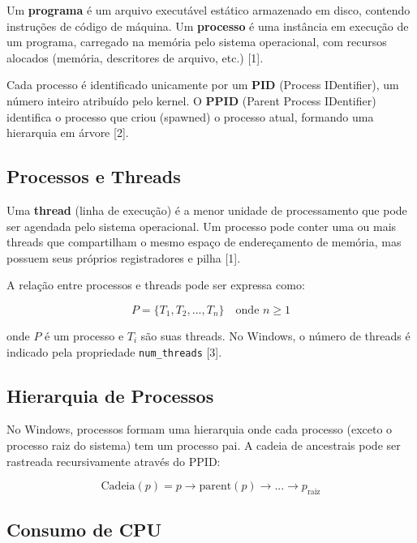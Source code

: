 \documentclass[12pt,a4paper]{article}
\begin{document}
Um \textbf{programa} é um arquivo executável estático armazenado em disco, contendo instruções de código de máquina. Um \textbf{processo} é uma instância em execução de um programa, carregado na memória pelo sistema operacional, com recursos alocados (memória, descritores de arquivo, etc.) [1].

Cada processo é identificado unicamente por um \textbf{PID} (Process IDentifier), um número inteiro atribuído pelo kernel. O \textbf{PPID} (Parent Process IDentifier) identifica o processo que criou (spawned) o processo atual, formando uma hierarquia em árvore [2].

\subsection{Processos e Threads}

Uma \textbf{thread} (linha de execução) é a menor unidade de processamento que pode ser agendada pelo sistema operacional. Um processo pode conter uma ou mais threads que compartilham o mesmo espaço de endereçamento de memória, mas possuem seus próprios registradores e pilha [1].

A relação entre processos e threads pode ser expressa como:

\begin{equation}
P = \{T_1, T_2, ..., T_n\} \quad \text{onde } n \geq 1
\end{equation}

onde $P$ é um processo e $T_i$ são suas threads. No Windows, o número de threads é indicado pela propriedade \texttt{num\_threads} [3].

\subsection{Hierarquia de Processos}

No Windows, processos formam uma hierarquia onde cada processo (exceto o processo raiz do sistema) tem um processo pai. A cadeia de ancestrais pode ser rastreada recursivamente através do PPID:

\begin{equation}
\text{Cadeia}(p) = p \rightarrow \text{parent}(p) \rightarrow ... \rightarrow p_{\text{raiz}}
\end{equation}

\subsection{Consumo de CPU}
\end{document}
